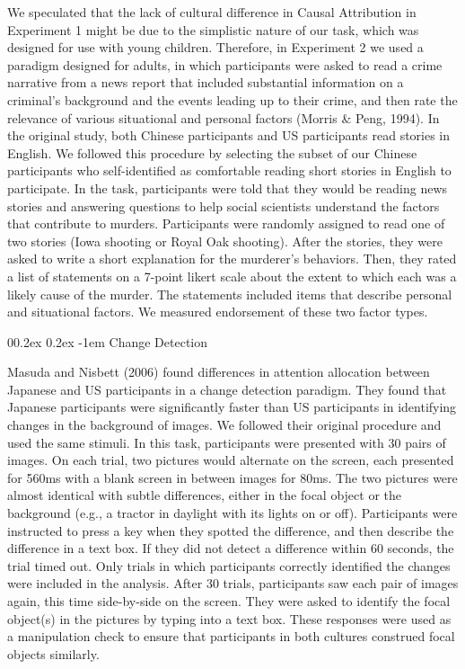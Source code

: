 \documentclass[
  man,floatsintext]{apa6}
\makeatletter
\let\oldparagraph\paragraph
\renewcommand{\paragraph}[1]{\oldparagraph{#1}\mbox{}}
\renewcommand{\paragraph}{\@startsection{paragraph}{4}{\parindent}%
  {0\baselineskip \@plus 0.2ex \@minus 0.2ex}%
  {-1em}%
  {\normalfont\normalsize\bfseries\itshape\typesectitle}}
\makeatother
\begin{document}
We speculated that the lack of cultural difference in Causal Attribution in Experiment 1 might be due to the simplistic nature of our task, which was designed for use with young children. Therefore, in Experiment 2 we used a paradigm designed for adults, in which participants were asked to read a crime narrative from a news report that included substantial information on a criminal's background and the events leading up to their crime, and then rate the relevance of various situational and personal factors (Morris \& Peng, 1994). In the original study, both Chinese participants and US participants read stories in English. We followed this procedure by selecting the subset of our Chinese participants who self-identified as comfortable reading short stories in English to participate. In the task, participants were told that they would be reading news stories and answering questions to help social scientists understand the factors that contribute to murders. Participants were randomly assigned to read one of two stories (Iowa shooting or Royal Oak shooting). After the stories, they were asked to write a short explanation for the murderer's behaviors. Then, they rated a list of statements on a 7-point likert scale about the extent to which each was a likely cause of the murder. The statements included items that describe personal and situational factors. We measured endorsement of these two factor types.

\hypertarget{change-detection}{%
\paragraph{Change Detection}\label{change-detection}}

Masuda and Nisbett (2006) found differences in attention allocation between Japanese and US participants in a change detection paradigm. They found that Japanese participants were significantly faster than US participants in identifying changes in the background of images. We followed their original procedure and used the same stimuli. In this task, participants were presented with 30 pairs of images. On each trial, two pictures would alternate on the screen, each presented for 560ms with a blank screen in between images for 80ms. The two pictures were almost identical with subtle differences, either in the focal object or the background (e.g., a tractor in daylight with its lights on or off). Participants were instructed to press a key when they spotted the difference, and then describe the difference in a text box. If they did not detect a difference within 60 seconds, the trial timed out. Only trials in which participants correctly identified the changes were included in the analysis. After 30 trials, participants saw each pair of images again, this time side-by-side on the screen. They were asked to identify the focal object(s) in the pictures by typing into a text box. These responses were used as a manipulation check to ensure that participants in both cultures construed focal objects similarly.
\end{document}
